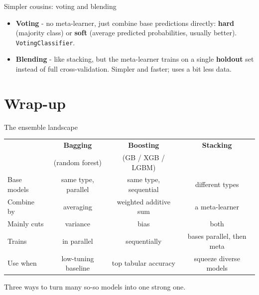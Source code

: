 \documentclass[aspectratio=169]{beamer}
\begin{document}
\begin{frame}{Simpler cousins: voting and blending}
  \begin{itemize}
    \item \textbf{Voting} - no meta-learner, just combine base predictions directly: \textbf{hard}
      (majority class) or \textbf{soft} (average predicted probabilities, usually better).
      \texttt{VotingClassifier}.
    \item \textbf{Blending} - like stacking, but the meta-learner trains on a single \textbf{holdout}
      set instead of full cross-validation. Simpler and faster; uses a bit less data.
  \end{itemize}
  \vfill
\end{frame}

\section*{Wrap-up}

\begin{frame}{The ensemble landscape}
  \begin{center}\small
    \renewcommand{\arraystretch}{1.3}
    \begin{tabular}{l c c c}
      \toprule
                   & \textbf{Bagging} & \textbf{Boosting} & \textbf{Stacking} \\
                   & {\scriptsize (random forest)} & {\scriptsize (GB / XGB / LGBM)} & \\
      \midrule
      Base models  & same type, parallel & same type, sequential & different types \\
      Combine by   & averaging & weighted additive sum & a meta-learner \\
      Mainly cuts  & variance & bias & both \\
      Trains       & in parallel & sequentially & bases parallel, then meta \\
      Use when     & low-tuning baseline & top tabular accuracy & squeeze diverse models \\
      \bottomrule
    \end{tabular}
  \end{center}
  \vfill
  \footnotesize Three ways to turn many so-so models into one strong one.
\end{frame}
\end{document}

